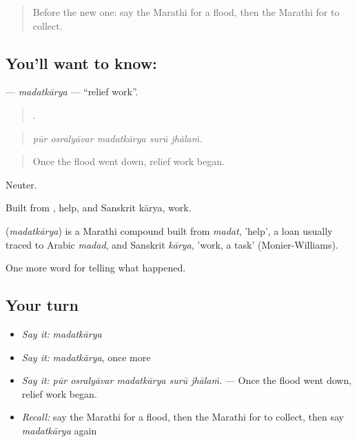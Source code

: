 \label{lesson:MR-C294-madatkarya}



\begin{quote}
Before the new one: say the Marathi for a flood, then the Marathi for to collect.
\end{quote}

\subsection*{You'll want to know: }
\textbf{} — \emph{madatkārya} — \textquotedblleft{}relief work\textquotedblright{}.

\begin{quote}
    .
\end{quote}

\begin{quote}
\emph{pūr osralyāvar madatkārya surū jhālaṁ.}
\end{quote}

\begin{quote}
Once the flood went down, relief work began.
\end{quote}

Neuter.

Built from , help, and Sanskrit kārya, work.

\begin{cousinweb}
\textbf{} (\emph{madatkārya}) is a Marathi compound built from \emph{madat}, 'help', a loan usually traced to Arabic \emph{madad}, and Sanskrit \emph{kārya}, 'work, a task' (Monier-Williams).
\end{cousinweb}

\begin{grammarlens}[title={What you've built}]
One more word for telling what happened.
\end{grammarlens}

\subsection*{Your turn}
\begin{itemize}
\raggedright
  \item \emph{Say it:} \emph{madatkārya}
  \item \emph{Say it:} \emph{madatkārya}, once more
  \item \emph{Say it:} \emph{pūr osralyāvar madatkārya surū jhālaṁ.} — Once the flood went down, relief work began.
  \item \emph{Recall:} say the Marathi for a flood, then the Marathi for to collect, then say \emph{madatkārya} again
\end{itemize}

